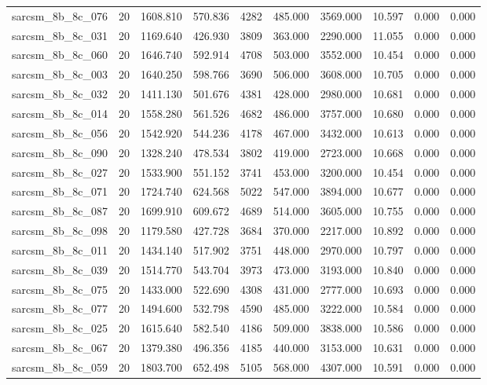 \begin{tabular}{lrrrrrrrrr}
sarcsm\_8b\_8c\_076 & 20 & 1608.810 & 570.836 & 4282 & 485.000 & 3569.000 & 10.597 & 0.000 & 0.000 \\
sarcsm\_8b\_8c\_031 & 20 & 1169.640 & 426.930 & 3809 & 363.000 & 2290.000 & 11.055 & 0.000 & 0.000 \\
sarcsm\_8b\_8c\_060 & 20 & 1646.740 & 592.914 & 4708 & 503.000 & 3552.000 & 10.454 & 0.000 & 0.000 \\
sarcsm\_8b\_8c\_003 & 20 & 1640.250 & 598.766 & 3690 & 506.000 & 3608.000 & 10.705 & 0.000 & 0.000 \\
sarcsm\_8b\_8c\_032 & 20 & 1411.130 & 501.676 & 4381 & 428.000 & 2980.000 & 10.681 & 0.000 & 0.000 \\
sarcsm\_8b\_8c\_014 & 20 & 1558.280 & 561.526 & 4682 & 486.000 & 3757.000 & 10.680 & 0.000 & 0.000 \\
sarcsm\_8b\_8c\_056 & 20 & 1542.920 & 544.236 & 4178 & 467.000 & 3432.000 & 10.613 & 0.000 & 0.000 \\
sarcsm\_8b\_8c\_090 & 20 & 1328.240 & 478.534 & 3802 & 419.000 & 2723.000 & 10.668 & 0.000 & 0.000 \\
sarcsm\_8b\_8c\_027 & 20 & 1533.900 & 551.152 & 3741 & 453.000 & 3200.000 & 10.454 & 0.000 & 0.000 \\
sarcsm\_8b\_8c\_071 & 20 & 1724.740 & 624.568 & 5022 & 547.000 & 3894.000 & 10.677 & 0.000 & 0.000 \\
sarcsm\_8b\_8c\_087 & 20 & 1699.910 & 609.672 & 4689 & 514.000 & 3605.000 & 10.755 & 0.000 & 0.000 \\
sarcsm\_8b\_8c\_098 & 20 & 1179.580 & 427.728 & 3684 & 370.000 & 2217.000 & 10.892 & 0.000 & 0.000 \\
sarcsm\_8b\_8c\_011 & 20 & 1434.140 & 517.902 & 3751 & 448.000 & 2970.000 & 10.797 & 0.000 & 0.000 \\
sarcsm\_8b\_8c\_039 & 20 & 1514.770 & 543.704 & 3973 & 473.000 & 3193.000 & 10.840 & 0.000 & 0.000 \\
sarcsm\_8b\_8c\_075 & 20 & 1433.000 & 522.690 & 4308 & 431.000 & 2777.000 & 10.693 & 0.000 & 0.000 \\
sarcsm\_8b\_8c\_077 & 20 & 1494.600 & 532.798 & 4590 & 485.000 & 3222.000 & 10.584 & 0.000 & 0.000 \\
sarcsm\_8b\_8c\_025 & 20 & 1615.640 & 582.540 & 4186 & 509.000 & 3838.000 & 10.586 & 0.000 & 0.000 \\
sarcsm\_8b\_8c\_067 & 20 & 1379.380 & 496.356 & 4185 & 440.000 & 3153.000 & 10.631 & 0.000 & 0.000 \\
sarcsm\_8b\_8c\_059 & 20 & 1803.700 & 652.498 & 5105 & 568.000 & 4307.000 & 10.591 & 0.000 & 0.000 \\

\end{tabular}
